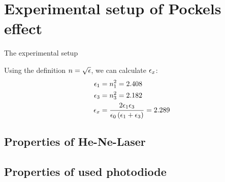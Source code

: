 \section{Experimental setup of Pockels effect}
The experimental setup



Using the definition $n = \sqrt{\epsilon}$, we can calculate $\epsilon_x$:
\begin{align}
    \epsilon_1 &= n_1^2 = 2.408 \\
    \epsilon_3 &= n_3^2 = 2.182 \\
    \epsilon_x &= \frac{2 \epsilon_1 \epsilon_3}{\epsilon_0 \left( \epsilon_1 + \epsilon_3\right)} = 2.289
\end{align}


\subsection{Properties of He-Ne-Laser}
\subsection{Properties of used photodiode}

